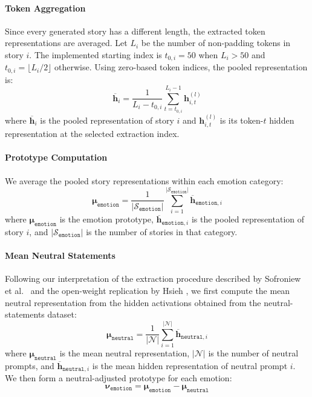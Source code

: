 \paragraph{Token Aggregation} Since every generated story has a different length, the extracted token representations are averaged. Let $L_i$ be 
the number of non-padding tokens in story $i$. The implemented starting index is $t_{0,i}=50$ when $L_i>50$ and $t_{0,i}=\lfloor L_i/2\rfloor$ otherwise. 
Using zero-based token indices, the pooled representation is:
\begin{equation}
    \mathbf{\overline{h}}_i=\frac{1}{L_i-t_{0,i}}\sum_{t=t_{0,i}}^{L_i-1}\mathbf{h}_{i,t}^{(l)}
    \label{eqtn:token-aggr}
\end{equation}
where $\mathbf{\overline{h}}_i$ is the pooled representation of story $i$ and $\mathbf{h}_{i,t}^{(l)}$ is its token-$t$ hidden representation at 
the selected extraction index.

\paragraph{Prototype Computation} We average the pooled story representations within each emotion category:
\begin{equation}
    \boldsymbol{\mu}_{\mathtt{emotion}}=\frac{1}{\left|\mathcal{S}_{\mathtt{emotion}}\right|}\sum_{i=1}^{\left|\mathcal{S}_\mathtt{emotion}\right|}\mathbf{\overline{h}}_{\mathtt{emotion},i}
    \label{eqtn:prototype-comp}
\end{equation}
where $\boldsymbol{\mu}_{\mathtt{emotion}}$ is the emotion prototype,
$\mathbf{\overline{h}}_{\mathtt{emotion},i}$ is the pooled representation of story $i$, and
$\left|\mathcal{S}_{\mathtt{emotion}}\right|$ is the number of stories in that category.

\paragraph{Mean Neutral Statements} Following our interpretation of the extraction procedure described by Sofroniew et al.\ \cite{sofroniew_emotion_2026} and the open-weight replication by Hsieh \cite{hsieh_replicating_2026}, we first compute the mean neutral representation from the hidden activations obtained from the neutral-statements dataset:
\begin{equation}
    \boldsymbol{\mu}_{\mathtt{neutral}}=\frac{1}{\left|\mathcal{N}\right|}\sum_{i=1}^{\left|\mathcal{N}\right|}\mathbf{\overline{h}}_{\mathtt{neutral},i}
    \label{eqtn:neutral-mean}
\end{equation}
where $\boldsymbol{\mu}_{\mathtt{neutral}}$ is the mean neutral representation, $\left|\mathcal{N}\right|$ is the number of neutral prompts, and
$\mathbf{\overline{h}}_{\mathtt{neutral},i}$ is the mean hidden representation of neutral prompt $i$. We then form a neutral-adjusted prototype 
for each emotion:
\begin{equation}
    \boldsymbol{\nu}_{\mathtt{emotion}}=\boldsymbol{\mu}_{\mathtt{emotion}}-\boldsymbol{\mu}_{\mathtt{neutral}}
    \label{eqtn:neutral-adjusted-prototype}
\end{equation}

